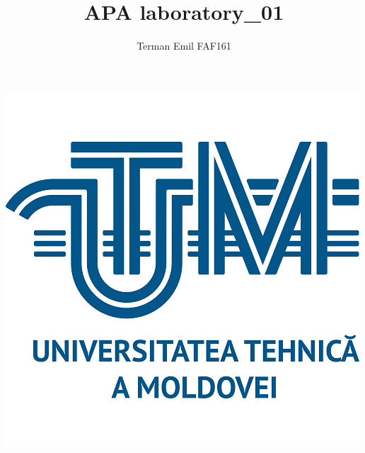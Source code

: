 \documentclass{article}
\begin{document}

	\newcommand{\myIncludeImg}[4]{
		\begin{center} \begin{figure}[!ht]
			\begin{mdframed}[backgroundcolor=black!5, rightline=false, leftline=false]
				\begin{center}
					\texttt{[image: \#2]}
					\caption{#3}
				\end{center}
			\end{mdframed}
			\label{fig:#4}
		\end{figure} \end{center}
	}

	\newcommand{\myCenter}[1]{
		\begin{center}
			#1
		\end{center}
	}
	\makeatletter
	\newenvironment{sqcases} {
		\matrix@check\sqcases\env@sqcases
	}{
		\endarray \right.
	}
	\def\env@sqcases {
		\let \@ifnextchar \new@ifnextchar
		\left \lbrack
		\def \arraystretch{1.2}
		\array{@{}l@{\quad}l@{}}
	}
	\makeatother


	\title{APA laboratory\_01}
	\author{Terman Emil FAF161}
	\maketitle

	\vspace*{\fill}
	
	\begin{center}
		\includegraphics{imgs/UTM_logo.png}
	\end{center}
\end{document}
